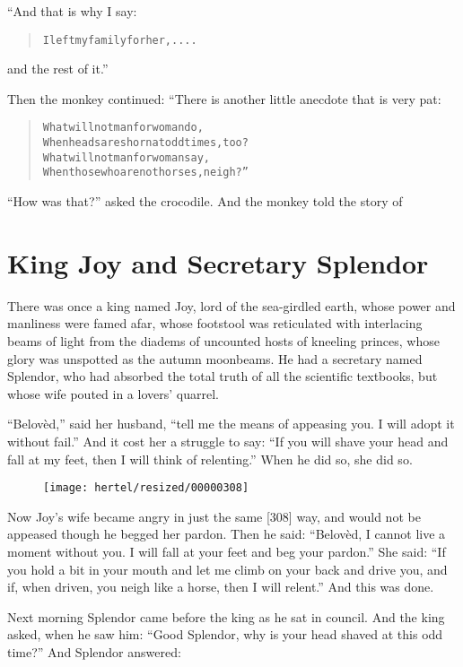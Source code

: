 \documentclass[article, twoside, 10pt]{memoir}
\renewenvironment{verbatim}{%
\begin{quote}%
\vskip -10pt%
\begin{alltt}\normalfont\small}{\end{alltt}%
\end{quote}%
\vskip -10pt
} %
\begin{document}
“And that is why I say:

\begin{verbatim}
I left my family for her, ....
\end{verbatim}
and the rest of it.”

Then the monkey continued: “There is another little anecdote that
is very pat:

\begin{verbatim}
What will not man for woman do,
When heads are shorn{\textemdash}at odd times, too?
What will not man for woman say,
When those who are not horses, neigh?”
\end{verbatim}
``How was that?'' asked the crocodile. And the monkey told the
story of

\chapter{King Joy and Secretary Splendor}

There was once a king named Joy, lord of the sea-girdled earth,
whose power and manliness were famed afar, whose footstool was
reticulated with interlacing beams of light from the diadems of
uncounted hosts of kneeling princes, whose glory was unspotted as
the autumn moonbeams. He had a secretary named Splendor, who had
absorbed the total truth of all the scientific textbooks, but whose
wife pouted in a lovers' quarrel.

``Belovèd,'' said her husband,
``tell me the means of appeasing you. I will adopt it without fail.''
And it cost her a struggle to say:
``If you will shave your head and fall at my feet, then I will think of relenting.''
When he did so, she did so.

\begin{figure}[p]\texttt{[image: hertel/resized/00000308]}\end{figure}Now Joy's wife became angry in just the same [308] way, and would
not be appeased though he begged her pardon. Then he said:
``Belovèd, I cannot live a moment without you. I will fall at your feet and beg your pardon.''
She said:
``If you hold a bit in your mouth and let me climb on your back and drive you, and if, when driven, you neigh like a horse, then I will relent.''
And this was done.

Next morning Splendor came before the king as he sat in council.
And the king asked, when he saw him:
``Good Splendor, why is your head shaved at this odd time?'' And
Splendor answered:
\end{document}
